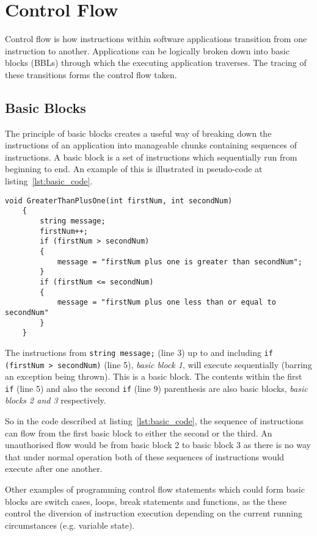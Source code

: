 \section{Control Flow}
Control flow is how instructions within software applications transition from one instruction to another. Applications can be logically broken down into basic blocks (BBLs) through which the executing application traverses. The tracing of these transitions forms the control flow taken.

\subsection{Basic Blocks}
The principle of basic blocks creates a useful way of breaking down the instructions of an application into manageable chunks containing sequences of instructions. A basic block is a set of instructions which sequentially run from beginning to end. An example of this is illustrated in pseudo-code at listing~\ref{lst:basic_code}.

\begin{lstlisting}[language={[Sharp]C},caption={An example of code which can be broken down into basic blocks},label={lst:basic_code}]
void GreaterThanPlusOne(int firstNum, int secondNum)
    {
        string message;
        firstNum++;
        if (firstNum > secondNum)
        {
            message = "firstNum plus one is greater than secondNum";
        }
        if (firstNum <= secondNum)
        {
            message = "firstNum plus one less than or equal to secondNum"
        }
    }
\end{lstlisting}

The instructions from \verb|string message;| (line 3) up to and including \verb|if (firstNum > secondNum)| (line 5), \textit{basic block 1}, will execute sequentially (barring an exception being thrown). This is a basic block. The contents within the first \verb|if| (line 5) and also the second \verb|if| (line 9) parenthesis are also basic blocks, \textit{basic blocks 2 and 3} respectively.

So in the code described at listing~\ref{lst:basic_code}, the sequence of instructions can flow from the first basic block to either the second or the third. An unauthorised flow would be from basic block 2 to basic block 3 as there is no way that under normal operation both of these sequences of instructions would execute after one another.

Other examples of programming control flow statements which could form basic blocks are switch cases, loops, break statements and functions, as the these control the diversion of instruction execution depending on the current running circumstances (e.g. variable state).

